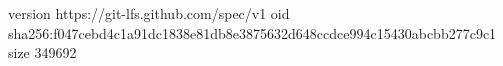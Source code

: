 version https://git-lfs.github.com/spec/v1
oid sha256:f047cebd4c1a91dc1838e81db8e3875632d648ccdce994c15430abcbb277c9c1
size 349692
